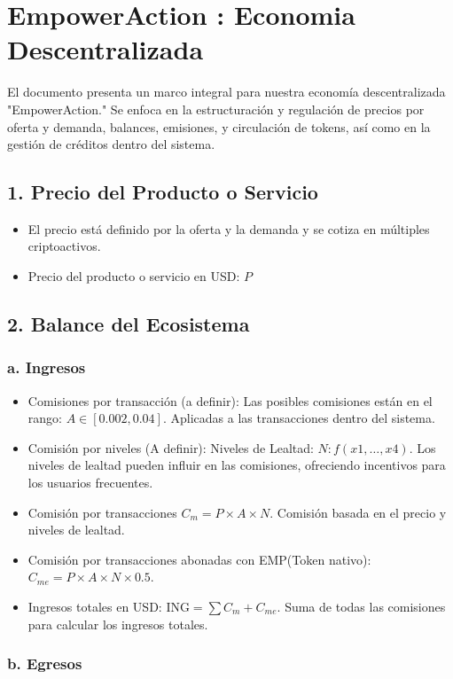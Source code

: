 \documentclass{article}
\begin{document}
\section*{EmpowerAction : Economia Descentralizada}

El documento presenta un marco integral para nuestra economía descentralizada "EmpowerAction." 
Se enfoca en la estructuración y regulación de precios por oferta y demanda, balances, emisiones, y circulación de tokens, así como en la gestión de créditos dentro del sistema.


\subsection*{1. Precio del Producto o Servicio}
\begin{itemize}
    \item El precio está definido por la oferta y la demanda y se cotiza en múltiples criptoactivos.
    \item Precio del producto o servicio en USD: \( P \)
\end{itemize}
\subsection*{2. Balance del Ecosistema}
\subsubsection*{a. Ingresos}
\begin{itemize}
    \item Comisiones por transacción (a definir): Las posibles comisiones están en el rango: \( A \in [0.002, 0.04] \). Aplicadas a las transacciones dentro del sistema.
    \item Comisión por niveles (A definir): Niveles de Lealtad: \( N: f(x1,\ldots,x4) \). Los niveles de lealtad pueden influir en las comisiones, ofreciendo incentivos para los usuarios frecuentes.
    \item Comisión por transacciones \( C_m = P \times A \times N \). Comisión  basada en el precio y niveles de lealtad.
    \item Comisión por transacciones abonadas con EMP(Token nativo): \( C_{me} = P \times A \times N \times 0.5 \). 
    \item Ingresos totales en USD: \( \text{ING} = \sum C_m + C_{me} \). Suma de todas las comisiones para calcular los ingresos totales.
\end{itemize}
\subsubsection*{b. Egresos}
\end{document}
